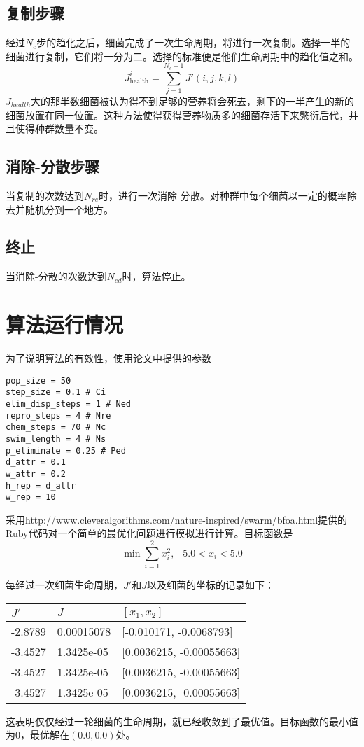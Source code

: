 \documentclass{article}
\begin{document}
\subsection{复制步骤}
经过$N_c$步的趋化之后，细菌完成了一次生命周期，将进行一次复制。选择一半的细菌进行复制，它们将一分为二。选择的标准便是他们生命周期中的趋化值之和。
\begin{equation}
    J_{\text{health}}^{i} = \sum_{j=1}^{N_c+1} J'(i, j, k, l)
\end{equation}
$J_{health}$大的那半数细菌被认为得不到足够的营养将会死去，剩下的一半产生的新的细菌放置在同一位置。这种方法使得获得营养物质多的细菌存活下来繁衍后代，并且使得种群数量不变。

\subsection{消除-分散步骤}
当复制的次数达到$N_{re}$时，进行一次消除-分散。对种群中每个细菌以一定的概率除去并随机分到一个地方。

\subsection{终止}
当消除-分散的次数达到$N_{ed}$时，算法停止。

\section{算法运行情况}
为了说明算法的有效性，使用论文中提供的参数
\begin{lstlisting}
pop_size = 50
step_size = 0.1 # Ci
elim_disp_steps = 1 # Ned
repro_steps = 4 # Nre
chem_steps = 70 # Nc
swim_length = 4 # Ns
p_eliminate = 0.25 # Ped
d_attr = 0.1
w_attr = 0.2 
h_rep = d_attr
w_rep = 10
\end{lstlisting}
采用http://www.cleveralgorithms.com/nature-inspired/swarm/bfoa.html提供的Ruby代码对一个简单的最优化问题进行模拟进行计算。目标函数是
\begin{equation}
\min \sum_{i=1}^2 x_i^2, -5.0 < x_i < 5.0
\end{equation}

每经过一次细菌生命周期，$J'$和$J$以及细菌的坐标的记录如下：
\begin{center}
\begin{tabular}{l|l|l}
    \hline
    $J'$ & $J$ & $[x_1, x_2]$ \\\hline
    -2.8789 & 0.00015078 & [-0.010171, -0.0068793] \\
    -3.4527 & 1.3425e-05 & [0.0036215, -0.00055663] \\
    -3.4527 & 1.3425e-05 & [0.0036215, -0.00055663] \\
    -3.4527 & 1.3425e-05 & [0.0036215, -0.00055663]
\end{tabular}
\end{center}
这表明仅仅经过一轮细菌的生命周期，就已经收敛到了最优值。目标函数的最小值为0，最优解在$(0.0, 0.0)$处。
\end{document}
